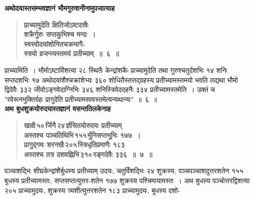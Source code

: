 \documentclass[11pt, openany]{book}
\begin{document}
\newpage

\begin{sloppypar}
{\small \textbf{अथोदयास्तसम्भवज्ञानं भौमगुरुशनीनामुपजात्याह\textendash }}

 \label{6.6}
\begin{quote}
{\large \textbf{{\color{purple}प्राच्यामुदेति क्षितिजोऽष्टदस्रैः\\
शक्रैर्गुरुः सप्तकुभिश्च मन्दः~। \\
स्वस्वोदयांशोनितचक्रभागै-\\
स्त्रयो व्रजन्त्यस्तमयं प्रतीच्याम्~॥~६~॥}}}
\end{quote}

प्राच्यामिति~। भौमोऽष्टाविंशत्या २८ स्थितैः केन्द्रांशकैः प्राच्यामुदेति तथा गुरुश्चतुर्दशभिः १४ शनिः सप्तदशभिः १७ अथोदयांशैश्चक्रांशेभ्यः ३६० शोधितैस्तत्तद्ग्रहस्य प्रतीच्यामस्तमयो भवति तद्यथा भौमो द्विदेवैः ३३२ जीवोऽङ्गवेदाग्निभिः ३४६ शनिस्त्रिवेददहनैः ३३४ प्रतीच्यामस्तमेति~। उक्तं च {\color{violet}"रवेरूनभुक्तिर्ग्रहः प्रागुदेति प्रतीच्यामसावस्तमेत्यन्यथान्यः"}~॥~६~॥\\

{\small \textbf{अथ बुधशुक्रयोरुदयास्तज्ञानं वसन्ततिलकेनाह\textendash }}

 \label{6.7}
\begin{quote}
{\large \textbf{{\color{purple}खाक्षै\textendash \,५०\textendash \,र्जिनै\textendash \,२४\textendash \,र्ज्ञसितयोरुदयः प्रतीच्याम् \\
अस्तश्च पञ्चतिथिभि\textendash \,१५५\textendash \,र्मुनिसप्तभूभिः १७७~।\\
प्रागुद्गमः शरनखै\textendash \,२०५\textendash \,स्त्रिधृतिप्रमाणैः १८३ \\
अस्तश्च तत्र दशवह्निभि\textendash \,३१०\textendash \,रङ्गदेवैः ३३६~॥~७~॥}}}
\end{quote}

पञ्चाशद्भिः शीघ्रकेन्द्रांशैर्बुधस्य प्रतीच्याम् उदयः, चतुर्विंशद्भिः २४ शुक्रस्य, पञ्चपञ्चाशदुत्तरशतेन १५५ बुधस्य प्रतीच्यामस्तः, सप्तसप्तत्युत्तर-शतेन १७७ शुक्रस्य पश्चिमायामस्तः~। अथ बुधस्य पञ्चोत्तरद्विशत्या २०५ प्राच्यामुदयः, शुक्रस्य त्र्यशीत्युत्तरशतेन १८३ प्राच्यामुदयः, बुधस्य दशो-
\end{sloppypar}

\newpage
\end{document}
